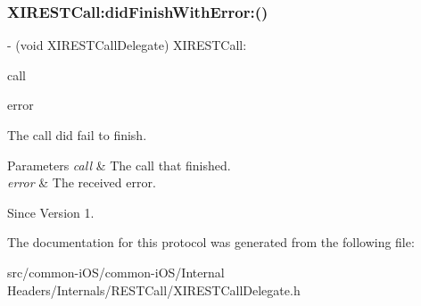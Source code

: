 \subsubsection{\texorpdfstring{X\+I\+R\+E\+S\+T\+Call\+:did\+Finish\+With\+Error\+:()}{XIRESTCall:didFinishWithError:()}}
{\footnotesize\ttfamily -\/ (void X\+I\+R\+E\+S\+T\+Call\+Delegate) X\+I\+R\+E\+S\+T\+Call\+: \begin{DoxyParamCaption}\item[{(id$<$ X\+I\+R\+E\+S\+T\+Call $>$)}]{call }\item[{didFinishWithError:(N\+S\+Error $\ast$)}]{error }\end{DoxyParamCaption}}



The call did fail to finish. 


\begin{DoxyParams}{Parameters}
{\em call} & The call that finished. \\
\hline
{\em error} & The received error. \\
\hline
\end{DoxyParams}
\begin{DoxySince}{Since}
Version 1. 
\end{DoxySince}


The documentation for this protocol was generated from the following file\+:\begin{DoxyCompactItemize}
\item 
src/common-\/i\+O\+S/common-\/i\+O\+S/\+Internal Headers/\+Internals/\+R\+E\+S\+T\+Call/X\+I\+R\+E\+S\+T\+Call\+Delegate.\+h\end{DoxyCompactItemize}
